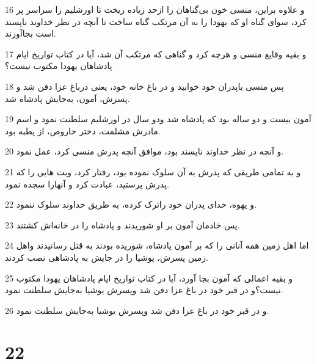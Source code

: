 \par 16 و علاوه براین، منسی خون بی‌گناهان را ازحد زیاده ریخت تا اورشلیم را سراسر پر کرد، سوای گناه او که یهودا را به آن مرتکب گناه ساخت تا آنچه در نظر خداوند ناپسند است بجاآورند.
\par 17 و بقیه وقایع منسی و هرچه کرد و گناهی که مرتکب آن شد، آیا در کتاب تواریخ ایام پادشاهان یهودا مکتوب نیست؟
\par 18 پس منسی باپدران خود خوابید و در باغ خانه خود، یعنی درباغ عزا دفن شد و پسرش، آمون، به‌جایش پادشاه شد.
\par 19 آمون بیست و دو ساله بود که پادشاه شد ودو سال در اورشلیم سلطنت نمود و اسم مادرش مشلمت، دختر حاروص، از یطبه بود.
\par 20 و آنچه در نظر خداوند ناپسند بود، موافق آنچه پدرش منسی کرد، عمل نمود.
\par 21 و به تمامی طریقی که پدرش به آن سلوک نموده بود، رفتار کرد، وبت هایی را که پدرش پرستید، عبادت کرد و آنهارا سجده نمود.
\par 22 و یهوه، خدای پدران خود راترک کرده، به طریق خداوند سلوک ننمود.
\par 23 پس خادمان آمون بر او شوریدند و پادشاه را در خانه‌اش کشتند.
\par 24 اما اهل زمین همه آنانی را که بر آمون پادشاه، شوریده بودند به قتل رسانیدند واهل زمین پسرش، یوشیا را در جایش به پادشاهی نصب کردند.
\par 25 و بقیه اعمالی که آمون بجا آورد، آیا در کتاب تواریخ ایام پادشاهان یهودا مکتوب نیست؟و در قبر خود در باغ عزا دفن شد وپسرش یوشیا به‌جایش سلطنت نمود.
\par 26 و در قبر خود در باغ عزا دفن شد وپسرش یوشیا به‌جایش سلطنت نمود.
 
\chapter{22}

